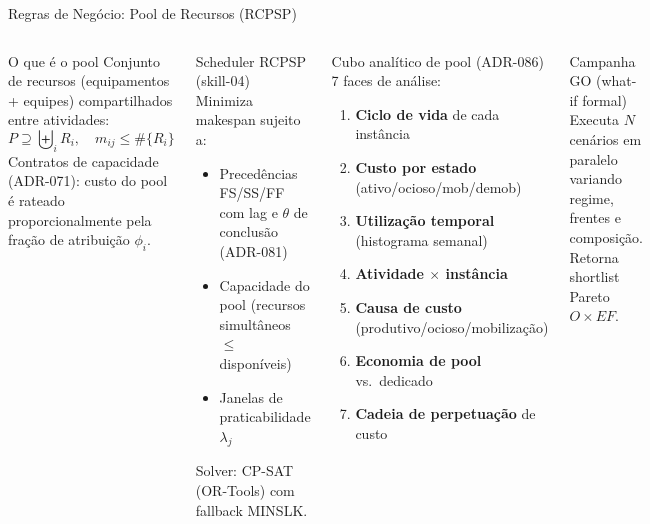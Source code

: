 \documentclass[aspectratio=169,10pt]{beamer}
\begin{document}
\begin{frame}{Regras de Negócio: Pool de Recursos (RCPSP)}
  \begin{columns}[T]
    \begin{block}{O que é o pool}
      Conjunto de recursos (equipamentos + equipes) compartilhados entre atividades:
      \[
        P \supseteq \biguplus_i R_i, \quad m_{ij} \leq \#\{R_i\}
      \]
      Contratos de capacidade (ADR-071): custo do pool é rateado proporcionalmente
      pela fração de atribuição $\phi_i$.
    \end{block}
    \vspace{4pt}
    \begin{block}{Scheduler RCPSP (skill-04)}
      Minimiza makespan sujeito a:
      \begin{itemize}\scriptsize
        \item Precedências FS/SS/FF com lag e $\theta$ de conclusão (ADR-081)
        \item Capacidade do pool (recursos simultâneos $\leq$ disponíveis)
        \item Janelas de praticabilidade $\lambda_j$
      \end{itemize}
      Solver: CP-SAT (OR-Tools) com fallback MINSLK.
    \end{block}

    \begin{block}{Cubo analítico de pool (ADR-086)}
      7 faces de análise:
      \begin{enumerate}\scriptsize
        \item \textbf{Ciclo de vida} de cada instância
        \item \textbf{Custo por estado} (ativo/ocioso/mob/demob)
        \item \textbf{Utilização temporal} (histograma semanal)
        \item \textbf{Atividade $\times$ instância}
        \item \textbf{Causa de custo} (produtivo/ocioso/mobilização)
        \item \textbf{Economia de pool} vs.\ dedicado
        \item \textbf{Cadeia de perpetuação} de custo
      \end{enumerate}
    \end{block}
    \vspace{4pt}
    \begin{exampleblock}{\small Campanha GO (what-if formal)}
      \scriptsize Executa $N$ cenários em paralelo variando regime,
      frentes e composição. Retorna shortlist Pareto $O \times EF$.
    \end{exampleblock}
  \end{columns}
\end{frame}
\end{document}
